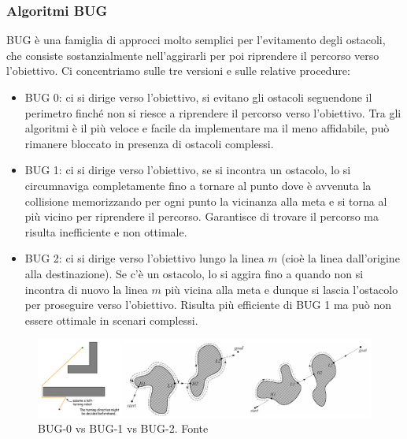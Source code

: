 \subsubsection{Algoritmi BUG}
BUG è una famiglia di approcci molto semplici per l'evitamento degli ostacoli, che consiste sostanzialmente nell'aggirarli per poi riprendere il percorso verso l'obiettivo. Ci concentriamo sulle tre versioni e sulle relative procedure:
\begin{itemize}
    \item BUG 0: ci si dirige verso l'obiettivo, si evitano gli ostacoli seguendone il perimetro finché non si riesce a riprendere il percorso verso l'obiettivo. Tra gli algoritmi è il più veloce e facile da implementare ma il meno affidabile, può rimanere bloccato in presenza di ostacoli complessi.
    \item BUG 1: ci si dirige verso l'obiettivo, se si incontra un ostacolo, lo si circumnaviga completamente fino a tornare al punto dove è avvenuta la collisione memorizzando per ogni punto la vicinanza alla meta e si torna al più vicino per riprendere il percorso. Garantisce di trovare il percorso ma risulta inefficiente e non ottimale.
    \item BUG 2: ci si dirige verso l'obiettivo lungo la linea $m$ (cioè la linea dall'origine alla destinazione). Se c'è un ostacolo, lo si aggira fino a quando non si incontra di nuovo la linea $m$ più vicina alla meta e dunque si lascia l'ostacolo per proseguire verso l'obiettivo. Risulta più efficiente di BUG 1 ma può non essere ottimale in scenari complessi.
\end{itemize}

\begin{figure}[h]
    \centering
    \includegraphics[width=1\linewidth]{immagini/bug_alg.png}
    \caption{BUG-0 vs BUG-1 vs BUG-2. Fonte \cite{choudhury2020design}}
    \label{fig:BUG}
\end{figure}


